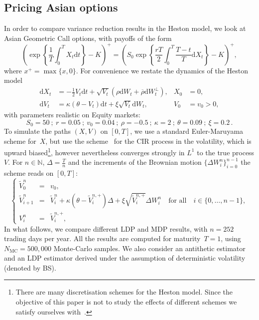 \documentclass{amsart}[11pt]
\numberwithin{equation}{section}
\numberwithin{theorem}{subsection}
\numberwithin{proposition}{subsection}
\numberwithin{definition}{subsection}
\numberwithin{lemma}{subsection}
\numberwithin{assumption}{subsection}
\newcommand{\NN}{\mathbb{N}}
\newcommand{\Wp}{W^{\perp}}
\newcommand{\brho}{\overline{\rho}}
\newcommand{\D}{\mathrm{d}}
\begin{document}
\subsection{Pricing Asian options}
In order to compare variance reduction results in the Heston model, we look at Asian Geometric Call options, with payoffs of the form
\[
\left(\exp\left\{\frac{1}{T}\int_0^T X_t\D t\right\} - K\right)^+ = \left(S_0 \exp\left \{\frac{rT}{2}\int_0^T\frac{T-t}{T}\D X_t\right \} - K\right)^+,
\]
where $x^+ = \max\{x,0\}$. For convenience we restate the dynamics of the Heston model
\begin{equation*}
\begin{array}{rlrl}
\D X_t &= -\frac{1}{2}V_t\D t + \sqrt{V_t}(\rho \D W_t + \brho\D \Wp_t), & X_0 &= 0,\\
\D V_t &= \kappa (\theta - V_t)\D t + \xi \sqrt{V_t}\D W_t, & V_0 &= v_0 > 0,
\end{array}
\end{equation*}
with parameters realistic on Equity markets:
\[
S_0 = 50 \ ; \ 
r = 0.05 \ ; \ 
v_0 = 0.04 \ ; \ 
\rho = -0.5 \ ; \ 
\kappa = 2 \ ; \ 
\theta = 0.09 \ ; \ 
\xi = 0.2 \,.
\]
To simulate the paths $(X,V)$ on $[0,T]$, 
we use a standard Euler-Maruyama scheme for~$X$, but use the scheme~\cite{Lord2009} for the CIR process in the volatility, 
which is upward biased\footnote{There are many discretisation schemes for the Heston model. 
Since the objective of this paper is not to study the effects of different schemes we satisfy ourselves with~\cite{Lord2009}.}, however nevertheless converges strongly in $L^1$ to the true process $V$. For $n\in\NN$, $\Delta =\frac{T}{n}$ and the increments of the Brownian motion $\{\Delta W_{i}^n\}_{i=0}^{n-1}$ the scheme reads on $[0,T]$:
\begin{equation*}
\left\{
\begin{array}{rcl}
\widetilde{V}_{0}^n & = & v_0,\\
\widetilde{V}_{i+1}^n & = & \widetilde{V}_{i}^n + \kappa \left(\theta - \widetilde{V}_{i}^{n,+}\right)\Delta + \xi \sqrt{\widetilde{V}_{i}^{n,+}}\Delta W_{i}^n \quad \text{for all} \quad i\in\{0,\dots,n-1\},\\
V_{i}^n & = & \widetilde{V}_{i}^{n,+},
\end{array}
\right.
\end{equation*}
In what follows, we compare different LDP and MDP results, with $n=252$ trading days per year. 
All the results are computed for maturity~$T=1$, using $N_{\text{MC}}=500,000$ Monte-Carlo samples. We also consider an antithetic estimator and an LDP estimator derived under the assumption of deterministic volatility (denoted by BS).
\end{document}
